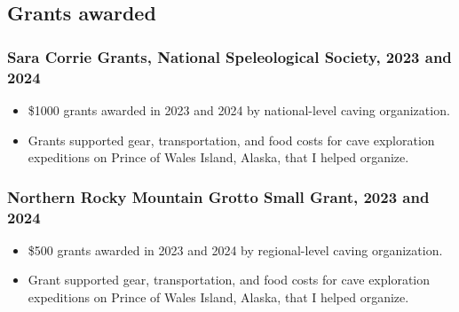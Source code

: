 \documentclass{article}
\begin{document}
	\subsection*{Grants awarded}
		\subsubsection*{Sara Corrie Grants, National Speleological Society, 2023 and 2024}
			\begin{itemize}
				\item \$1000 grants awarded in 2023 and 2024 by national-level caving organization.
				\item Grants supported gear, transportation, and food costs for cave exploration expeditions on Prince of Wales Island, Alaska, that I helped organize.
			\end{itemize}
		\subsubsection*{Northern Rocky Mountain Grotto Small Grant, 2023 and 2024}
			\begin{itemize}
				\item \$500 grants awarded in 2023 and 2024 by regional-level caving organization.
				\item Grant supported gear, transportation, and food costs for cave exploration expeditions on Prince of Wales Island, Alaska, that I helped organize.
			\end{itemize}

\end{document}
